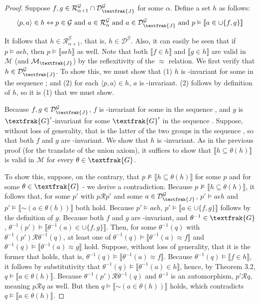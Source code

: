 \documentclass{article}
\newcommand*{\oldneg}{\mathord{\sim}}
\newcommand{\lbc}{\llbracket}
\newcommand{\rbc}{\rrbracket}
\let\biconditional\leftrightarrow
\theoremstyle{definition}
\begin{document}
\begin{proof}
Suppose $f,g\in\mathcal{R}^\mathcal{G}_{\alpha+1}\cap\mathcal{D}^\mathcal{G}_\textfrak{J}$ for some $\alpha$. Define a set 
$h$ as follows:
\[ \langle p,a\rangle\in h\biconditional p\in\mathcal{G}\textrm{ and }a\in\mathcal{R}^\mathcal{G}_\alpha\textrm{ and }
a\in\mathcal{D}^\mathcal{G}_\textfrak{J}\textrm{ and }p\vDash\lbc a\in\cup\{f,g\}\rbc \]

It follows that $h\in\mathcal{R}^\mathcal{G}_{\alpha+1}$, that is, $h\in\mathcal{D}^\mathcal{G}$. Also, it can easily be seen that 
if $p\vDash a\epsilon h$, then $p\vDash\lbc a\epsilon h\rbc$ as well. Note that both $\lbc f\in h\rbc$ and 
$\lbc g\in h\rbc$ are valid in $\mathcal{M}$ (and $\mathcal{M}_\textfrak{J}$) by the reflexitivity of the $\approx$ relation.
We first verify that $h\in\mathcal{D}^\mathcal{G}_\textfrak{J}$.
To show this, we must show that (1) $h$ is -invariant for some  in the sequence ; and (2) for each
$\langle p,a\rangle\in h$, $a$ is -invariant. (2) follows by definition of $h$, so it is (1) that we must show.

Because $f,g\in\mathcal{D}^\mathcal{G}_\textfrak{J}$, $f$ is -invariant for some  in the sequence ,
and $g$ is $\textfrak{G}'$-invariant for some $\textfrak{G}'$ in the sequence . Suppose, without loss of generality, that 
 is the latter of the two groups in the sequence , so that both 
$f$ and $g$ are -invariant. We show that $h$ is -invariant. As in the previous proof (for the 
translate of the union axiom), it suffices to show that $\lbc h\subseteq\theta(h)\rbc$ is valid in $\mathcal{M}$ for 
every $\theta\in\textfrak{G}$.

To show this, suppose, on the contrary, that $p\nvDash\lbc h\subseteq\theta(h)\rbc$ for some $p$ and for some 
$\theta\in\textfrak{G}$ - we derive a contradiction. Because $p\nvDash\lbc h\subseteq\theta(h)\rbc$, it follows that, for 
some $p'$ with $p\mathcal{R}p'$ and some $a\in\mathcal{D}^\mathcal{G}_\textfrak{J}$, 
$p'\vDash a\epsilon h$ and $p'\vDash\lbc\oldneg(a\in\theta(h))\rbc$ both hold. Because 
$p'\vDash a\epsilon h$, $p'\vDash\lbc a\in\cup\{f,g\}\rbc$ follows by the definition of $g$. Because 
both $f$ and $g$ are -invariant, and $\theta^{-1}\in\textfrak{G}$,
$\theta^{-1}(p')\vDash\lbc\theta^{-1}(a)\in\cup\{f,g\}\rbc$. Then, for some $\theta^{-1}(q)$ with $\theta^{-1}(p')\mathcal{R}\theta^{-1}(q)$, 
at least one of $\theta^{-1}(q)\vDash\lbc\theta^{-1}(a)\approx f\rbc$ and 
$\theta^{-1}(q)\vDash\lbc\theta^{-1}(a)\approx g\rbc$ hold. Suppose, without loss of generality, that it is the former that holds, that is,
$\theta^{-1}(q)\vDash\lbc\theta^{-1}(a)\approx f\rbc$. Because $\theta^{-1}(q)\vDash\lbc f\in h\rbc$, it follows by substitutivity that
$\theta^{-1}(q)\vDash\lbc\theta^{-1}(a)\in h\rbc$, hence, by Theorem 3.2,
$q\vDash\lbc a\in\theta(h)\rbc$. Because $\theta^{-1}(p')\mathcal{R}\theta^{-1}(q)$ and $\theta^{-1}$ is an automorphism,
$p'\mathcal{R}q$, meaning $p\mathcal{R}q$ as well. But then $q\vDash\lbc\oldneg(a\in\theta(h))\rbc$ holds, which 
contradicts $q\vDash\lbc a\in\theta(h)\rbc$.


\end{proof}
\end{document}
